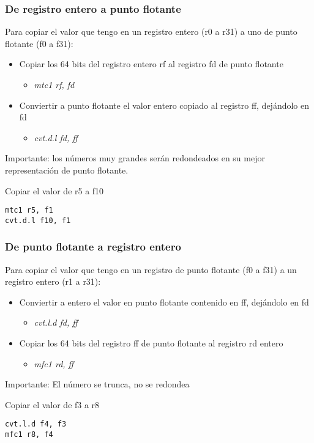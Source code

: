 \documentclass{beamer}
\begin{document}
\begin{frame}[fragile]
\frametitle{De registro entero a punto flotante}
Para copiar el valor que tengo en un registro entero (r0 a r31) a uno de punto flotante (f0 a f31):
\begin{itemize}
\item Copiar los 64 bits del registro entero rf al registro fd de punto flotante
\begin{itemize}
\item \emph{mtc1 rf, fd}
\end{itemize}

\item Conviertir a punto flotante el valor entero copiado al registro ff, dejándolo en fd
\begin{itemize}
\item \emph{cvt.d.l fd, ff}
\end{itemize}

\end{itemize}

Importante: los números muy grandes serán redondeados en su mejor representación de punto flotante.

\begin{block}{Copiar el valor de r5 a f10}
\begin{lstlisting}[language=WinMIPS64,basicstyle=\ttfamily,keywordstyle=\color{blue}]
mtc1 r5, f1
cvt.d.l f10, f1
\end{lstlisting}
\end{block}

\end{frame}

\begin{frame}[fragile]
\frametitle{De punto flotante a registro entero}
Para copiar el valor que tengo en un registro de punto flotante (f0 a f31) a un registro entero (r1 a r31):
\begin{itemize}
\item Conviertir a entero el valor en punto flotante contenido en ff, dejándolo en fd
\begin{itemize}
\item \emph{cvt.l.d fd, ff}
\end{itemize}
\item Copiar los 64 bits del registro ff de punto flotante al registro rd entero
\begin{itemize}
\item \emph{mfc1 rd, ff}
\end{itemize}
\end{itemize}

Importante: El número se trunca, no se redondea
\begin{block}{Copiar el valor de f3 a r8}
\begin{lstlisting}[language=WinMIPS64,basicstyle=\ttfamily,keywordstyle=\color{blue}]
cvt.l.d f4, f3
mfc1 r8, f4
\end{lstlisting}
\end{block}

\end{frame}
\end{document}
